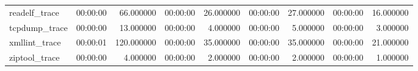 \begin{tabular}{llrlrlrlr}
readelf_trace & 00:00:00 & 66.000000 & 00:00:00 & 26.000000 & 00:00:00 & 27.000000 & 00:00:00 & 16.000000 \\
tcpdump_trace & 00:00:00 & 13.000000 & 00:00:00 & 4.000000 & 00:00:00 & 5.000000 & 00:00:00 & 3.000000 \\
xmllint_trace & 00:00:01 & 120.000000 & 00:00:00 & 35.000000 & 00:00:00 & 35.000000 & 00:00:00 & 21.000000 \\
ziptool_trace & 00:00:00 & 4.000000 & 00:00:00 & 2.000000 & 00:00:00 & 2.000000 & 00:00:00 & 1.000000 \\
\bottomrule
\end{tabular}
